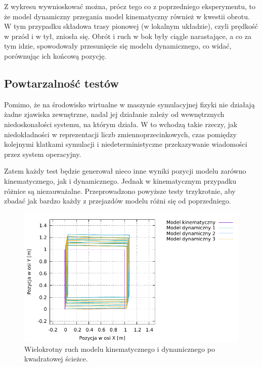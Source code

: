 		Z wykresu wywnioskować można, prócz tego co z poprzedniego eksperymentu, to że model dynamiczny przegania model kinematyczny również w kwestii obrotu.
		W tym przypadku składowa trasy pionowej (w lokalnym układzie), czyli prędkość w przód i w tył, zniosła się.
		Obrót i ruch w bok były ciągle narastające, a co za tym idzie, spowodowały przesunięcie się modelu dynamicznego, co widać, porównując ich końcową pozycję.
		
	\subsection{Powtarzalność testów}
		Pomimo, że na środowisko wirtualne w maszynie symulacyjnej fizyki nie działają żadne zjawiska zewnętrzne, nadal jej działanie zależy od wewnętrznych niedoskonałości
		systemu, na którym działa. W to wchodzą takie rzeczy, jak niedokładności w reprezentacji liczb zmiennoprzecinkowych, czas pomiędzy kolejnymi klatkami symulacji i 
		niedeterministyczne przekazywanie wiadomości przez system operacyjny.
		
		Zatem każdy test będzie generował nieco inne wyniki pozycji modelu zarówno kinematycznego, jak i dynamicznego. 
		Jednak w kinematycznym przypadku różnice są niezauważalne.
		Przeprowadzono powyższe testy trzykrotnie, aby zbadać jak bardzo każdy z przejazdów modelu różni się od poprzedniego.
		
		\begin{figure}[H]
			\centering
			\includegraphics[width=\textwidth]{plots/square_3.pdf}
				\caption{Wielokrotny ruch modelu kinematycznego i dynamicznego po kwadratowej ścieżce.}
			\label{plot:gramofon_square_3}
		\end{figure}
		
